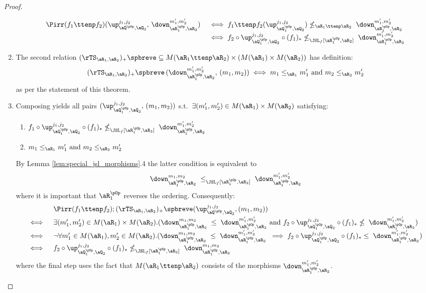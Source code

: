 \documentclass{article}
\begin{document}
\begin{proof}
\begin{enumerate}
\[
\begin{tabular}{lll}
$\Pirr(f_1 \ttenp f_2) (\up_{\aQ^{\pOp},\aQ_2}^{j_1,j_2},\,\down_{\aR_1^{\pOp},\aR_2}^{m'_1,m'_2})$
&
$\iff f_1 \ttenp f_2(\up_{\aQ_1^{\pOp},\aQ_2}^{j_1,j_2}) \nleq_{\aR_1 \ttenp \aR_2} \; \down_{\aR_1^{\pOp},\aR_2}^{m'_1,m'_2}$
\\&
$\iff f_2 \circ \up_{\aQ_1^{\pOp},\aQ_2}^{j_1,j_2} \circ (f_1)_*  \nleq_{\JSL_f[\aR_1^{\pOp},\aR_2]} \; \down_{\aR_1^{\pOp},\aR_2}^{m'_1,m'_2}$
\end{tabular}
\]
\item
The second relation $(\rTS_{\aR_1,\aR_2})_+\spbreve \subseteq M(\aR_1 \ttenp \aR_2) \times (M(\aR_1) \times M(\aR_2))$ has definition:
\[
(\rTS_{\aR_1,\aR_2})_+\spbreve \, (\down_{\aR_1^{\pOp},\aR_2}^{m'_1,m'_2},\, (m_1,m_2))
\iff m_1 \leq_{\aR_1} m'_1 \text{ and } m_2 \leq_{\aR_2} m'_2
\]
as per the statement of this theorem.

\item
Composing yields all pairs $(\up_{\aQ_1^{\pOp},\aQ_2}^{j_1,j_2},\,(m_1,m_2))$ s.t.\ $\exists (m'_1,m'_2) \in M(\aR_1) \times M(\aR_2)$ satisfying:
\begin{enumerate}
\item
$f_1 \circ \up_{\aQ_1^{\pOp},\aQ_2}^{j_1,j_2} \circ (f_1)_* \nleq_{\JSL_f[\aR_1^{\pOp},\aR_2]} \; \down_{\aR_1^{\pOp},\aR_2}^{m'_1,m'_2}$

\item
$m_1 \leq_{\aR_1} m'_1 \text{ and } m_2 \leq_{\aR_2} m'_2$
\end{enumerate}

By Lemma \ref{lem:special_jsl_morphisms}.4 the latter condition is equivalent to
\[
\down_{\aR_1^{\pOp},\aR_2}^{m_1,m_2} \; \leq_{\JSL_f[\aR_1^{\pOp},\aR_2]} \; \down_{\aR_1^{\pOp},\aR_2}^{m'_1,m'_2}
\]
where it is important that $\aR_1^{\pOp}$ reverses the ordering. Consequently:
\[
\begin{tabular}{lll}
& $\Pirr(f_1 \ttenp f_2) ; (\rTS_{\aR_1,\aR_2})_+\spbreve(\up_{\aQ^{\pOp},\aQ_2}^{j_1,j_2},(m_1,m_2))$
\\[1ex]
$\iff$ &
$\exists (m'_1,m'_2) \in M(\aR_1) \times M(\aR_2).(
\down_{\aR_1^{\pOp},\aR_2}^{m_1,m_2} \; \leq \; \down_{\aR_1^{\pOp},\aR_2}^{m'_1,m'_2}
\text{ and }
f_2 \circ \up_{\aQ_1^{\pOp},\aQ_2}^{j_1,j_2} \circ (f_1)_*  \nleq \; \down_{\aR_1^{\pOp},\aR_2}^{m'_1,m'_2}
)$
\\[1ex]
$\iff$ &
$\neg\forall m'_1 \in M(\aR_1), m'_2 \in M(\aR_2).(
\down_{\aR_1^{\pOp},\aR_2}^{m_1,m_2} \; \leq \; \down_{\aR_1^{\pOp},\aR_2}^{m'_1,m'_2}
\; \implies 
f_2 \circ \up_{\aQ_1^{\pOp},\aQ_2}^{j_1,j_2} \circ (f_1)_*  \leq \; \down_{\aR_1^{\pOp},\aR_2}^{m'_1,m'_2}
)$
\\[1ex]
$\iff$ &
$f_2 \circ \up_{\aQ_1^{\pOp},\aQ_2}^{j_1,j_2} \circ (f_1)_* \nleq_{\JSL_f[\aR_1^{\pOp},\aR_2]} \; \down_{\aR_1^{\pOp},\aR_2}^{m_1,m_2} $
\end{tabular}
\]
where the final step uses the fact that $M(\aR_1 \ttenp \aR_2)$ consists of the morphisms $\down_{\aR_1^{\pOp},\aR_2}^{m'_1,m'_2}$.
\end{enumerate}


\end{proof}
\end{document}
